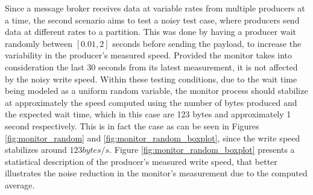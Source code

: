 Since a message broker receives data at variable rates from multiple producers
at a time, the second scenario aims to test a noisy test case, where producers
send data at different rates to a partition. This was done by having a producer
wait randomly between $[0.01, 2]$ seconds before sending the payload, to
increase the variability in the producer's measured speed. Provided the monitor
takes into consideration the last 30 seconds from its latest measurement, it is
not affected by the noisy write speed. Within these testing conditions, due to
the wait time being modeled as a uniform random variable, the monitor process
should stabilize at approximately the speed computed using the number of bytes
produced and the expected wait time, which in this case are 123 bytes and
approximately 1 second respectively. This is in fact the case as can be seen in
Figures \ref{fig:monitor_random} and \ref{fig:monitor_random_boxplot}, since the
write speed stabilizes around $123 bytes/s$. Figure
\ref{fig:monitor_random_boxplot} presents a statistical description of the
producer's measured write speed, that better illustrates the noise reduction in
the monitor's measurement due to the computed average.
